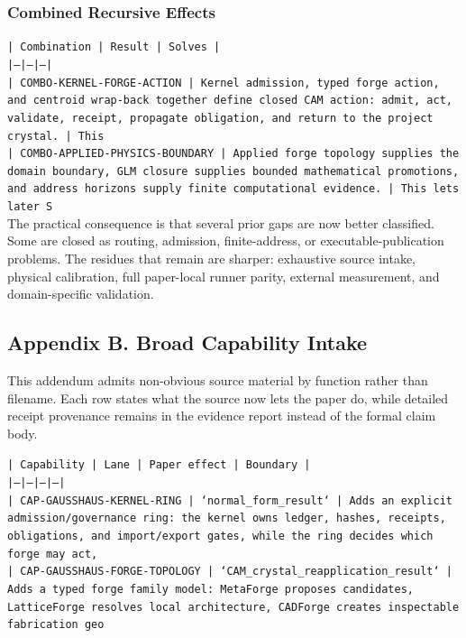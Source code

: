 \documentclass[11pt]{article}
\begin{document}
\subsubsection*{Combined Recursive Effects}

\noindent\texttt{| Combination | Result | Solves |}\\
\noindent\texttt{|---|---|---|}\\
\noindent\texttt{| COMBO-KERNEL-FORGE-ACTION | Kernel admission, typed forge action, and centroid wrap-back together define closed CAM action: admit, act, validate, receipt, propagate obligation, and return to the project crystal. | This}\\
\noindent\texttt{| COMBO-APPLIED-PHYSICS-BOUNDARY | Applied forge topology supplies the domain boundary, GLM closure supplies bounded mathematical promotions, and address horizons supply finite computational evidence. | This lets later S}\\

The practical consequence is that several prior gaps are now better classified. Some are closed as routing, admission, finite-address, or executable-publication problems. The residues that remain are sharper: exhaustive source intake, physical calibration, full paper-local runner parity, external measurement, and domain-specific validation.

\subsection*{Appendix B. Broad Capability Intake}

This addendum admits non-obvious source material by function rather than filename. Each row states what the source now lets the paper do, while detailed receipt provenance remains in the evidence report instead of the formal claim body.

\noindent\texttt{| Capability | Lane | Paper effect | Boundary |}\\
\noindent\texttt{|---|---|---|---|}\\
\noindent\texttt{| CAP-GAUSSHAUS-KERNEL-RING | `normal\_form\_result` | Adds an explicit admission/governance ring: the kernel owns ledger, hashes, receipts, obligations, and import/export gates, while the ring decides which forge may act,}\\
\noindent\texttt{| CAP-GAUSSHAUS-FORGE-TOPOLOGY | `CAM\_crystal\_reapplication\_result` | Adds a typed forge family model: MetaForge proposes candidates, LatticeForge resolves local architecture, CADForge creates inspectable fabrication geo}\\
\end{document}
